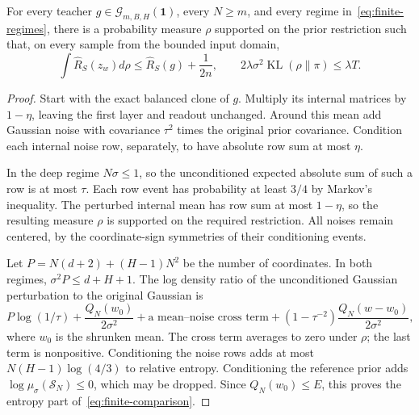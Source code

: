 \begin{lemma}
\label{lem:finite-comparison}
For every teacher $g\in\mathcal G_{m,B,H}(\boldsymbol1)$, every $N\geq m$, and every regime in~\eqref{eq:finite-regimes}, there is a probability measure $\rho$ supported on the prior restriction such that, on every sample from the bounded input domain,
\begin{equation}
 \int\widehat R_S(z_w)d\rho\leq\widehat R_S(g)+\frac1{2n},
 \qquad
 2\lambda\sigma^2\operatorname{KL}(\rho\|\pi)\leq\lambda T.
 \label{eq:finite-comparison}
\end{equation}
\end{lemma}
\begin{proof}
Start with the exact balanced clone of $g$. Multiply its internal matrices by $1-\eta$, leaving the first layer and readout unchanged. Around this mean add Gaussian noise with covariance $\tau^2$ times the original prior covariance. Condition each internal noise row, separately, to have absolute row sum at most $\eta$.

In the deep regime $N\sigma\leq1$, so the unconditioned expected absolute sum of such a row is at most $\tau$. Each row event has probability at least $3/4$ by Markov's inequality. The perturbed internal mean has row sum at most $1-\eta$, so the resulting measure $\rho$ is supported on the required restriction. All noises remain centered, by the coordinate-sign symmetries of their conditioning events.

Let $P=N(d+2)+(H-1)N^2$ be the number of coordinates. In both regimes, $\sigma^2P\leq d+H+1$. The log density ratio of the unconditioned Gaussian perturbation to the original Gaussian is
\[
 P\log(1/\tau)+\frac{Q_N(w_0)}{2\sigma^2}
 +\text{a mean--noise cross term}
 +(1-\tau^{-2})\frac{Q_N(w-w_0)}{2\sigma^2},
\]
where $w_0$ is the shrunken mean. The cross term averages to zero under $\rho$; the last term is nonpositive. Conditioning the noise rows adds at most $N(H-1)\log(4/3)$ to relative entropy. Conditioning the reference prior adds $\log\mu_\sigma(\mathcal S_N)\leq0$, which may be dropped. Since $Q_N(w_0)\leq E$, this proves the entropy part of~\eqref{eq:finite-comparison}.


\end{proof}
